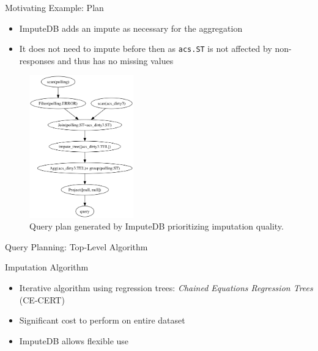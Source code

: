 \documentclass{beamer}
\newcommand{\ProjectName}{ImputeDB}
\begin{document}
\begin{frame}[fragile]{Motivating Example: Plan}
\begin{itemize}
	\item ImputeDB adds an impute as necessary for the aggregation
	\item It does not need to impute before then as \verb|acs.ST| is not affected by non-responses and thus has no missing values
\end{itemize}

\begin{figure}[!ht]
    \centering
    \includegraphics[width=0.4\textwidth]{../paper/figures/example.png}
    \caption{Query plan generated by ImputeDB prioritizing imputation quality.}
    \label{fig:query-plan}
\end{figure}
\end{frame}

\begin{frame}[fragile]{Query Planning: Top-Level Algorithm}

\begin{algorithm}[H]
\scriptsize

\end{algorithm}

\end{frame}

\begin{frame}[fragile]{Imputation Algorithm}
\begin{itemize}
	\item Iterative algorithm using regression trees: \textit{Chained Equations Regression Trees} (CE-CERT)\cite{burgette2010multiple}
	\item Significant cost to perform on entire dataset
	\item \ProjectName{} allows flexible use
\end{itemize}
\scriptsize

\begin{algorithm}[H]
\scriptsize

\end{algorithm}
\end{frame}
\end{document}
